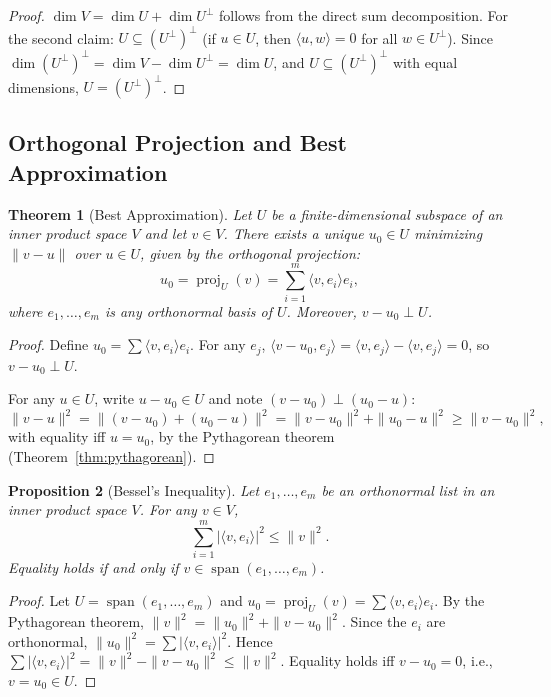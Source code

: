 \documentclass[11pt,a4paper]{article}
\theoremstyle{definition}
\theoremstyle{plain}
\newtheorem{theorem}{Theorem}[section]
\newtheorem{proposition}[theorem]{Proposition}
\theoremstyle{remark}
\DeclareMathOperator{\Span}{span}
\DeclareMathOperator{\proj}{proj}
\begin{document}
\begin{proof}
$\dim V = \dim U + \dim U^\perp$ follows from the direct sum decomposition. For the second
claim: $U \subseteq (U^\perp)^\perp$ (if $u \in U$, then $\langle u, w \rangle = 0$ for all
$w \in U^\perp$). Since $\dim(U^\perp)^\perp = \dim V - \dim U^\perp = \dim U$, and
$U \subseteq (U^\perp)^\perp$ with equal dimensions, $U = (U^\perp)^\perp$.
\end{proof}

\subsection{Orthogonal Projection and Best Approximation}
\label{subsec:projection}

\begin{theorem}[Best Approximation]
\label{thm:best_approx}
Let $U$ be a finite-dimensional subspace of an inner product space $V$ and let $v \in V$.
There exists a unique $u_0 \in U$ minimizing $\|v - u\|$ over $u \in U$, given by the
\emph{orthogonal projection}:
\[
    u_0 = \proj_U(v) = \sum_{i=1}^m \langle v, e_i \rangle e_i,
\]
where $e_1, \ldots, e_m$ is any orthonormal basis of $U$. Moreover, $v - u_0 \perp U$.
\end{theorem}

\begin{proof}
Define $u_0 = \sum \langle v, e_i \rangle e_i$. For any $e_j$,
$\langle v - u_0, e_j \rangle = \langle v, e_j \rangle - \langle v, e_j \rangle = 0$,
so $v - u_0 \perp U$.

For any $u \in U$, write $u - u_0 \in U$ and note $(v - u_0) \perp (u_0 - u)$:
\[
    \|v - u\|^2 = \|(v - u_0) + (u_0 - u)\|^2 = \|v - u_0\|^2 + \|u_0 - u\|^2 \geq \|v - u_0\|^2,
\]
with equality iff $u = u_0$, by the Pythagorean theorem (Theorem~\ref{thm:pythagorean}).
\end{proof}

\begin{proposition}[Bessel's Inequality]
\label{prop:bessel}
Let $e_1, \ldots, e_m$ be an orthonormal list in an inner product space $V$. For any $v \in V$,
\[
    \sum_{i=1}^m |\langle v, e_i \rangle|^2 \leq \|v\|^2.
\]
Equality holds if and only if $v \in \Span(e_1, \ldots, e_m)$.
\end{proposition}

\begin{proof}
Let $U = \Span(e_1, \ldots, e_m)$ and $u_0 = \proj_U(v) = \sum \langle v, e_i \rangle e_i$.
By the Pythagorean theorem, $\|v\|^2 = \|u_0\|^2 + \|v - u_0\|^2$. Since the $e_i$ are
orthonormal, $\|u_0\|^2 = \sum |\langle v, e_i \rangle|^2$. Hence
$\sum |\langle v, e_i \rangle|^2 = \|v\|^2 - \|v - u_0\|^2 \leq \|v\|^2$.
Equality holds iff $v - u_0 = 0$, i.e., $v = u_0 \in U$.
\end{proof}
\end{document}
